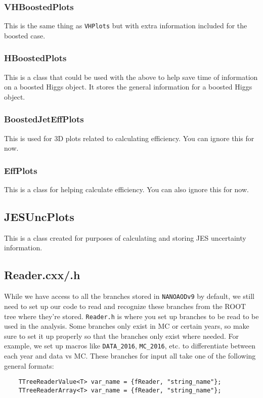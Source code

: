\subsubsection{VHBoostedPlots}
This is the same thing as \verb|VHPlots| but with extra information included for the boosted case.

\subsubsection{HBoostedPlots}
This is a class that could be used with the above to help save time of information on a boosted Higgs object. It stores the general information for a boosted Higgs object.

\subsubsection{BoostedJetEffPlots}
This is used for 3D plots related to calculating efficiency. You can ignore this for now.

\subsubsection{EffPlots}
This is a class for helping calculate efficiency. You can also ignore this for now.

\subsection{JESUncPlots}
This is a class created for purposes of calculating and storing JES uncertainty information. 

\subsection{Reader.cxx/.h}
While we have access to all the branches stored in \verb|NANOAODv9| by default, we still need to set up our code to read and recognize these branches from the ROOT tree where they're stored. \verb|Reader.h| is where you set up branches to be read to be used in the analysis. Some branches only exist in MC or certain years, so make sure to set it up properly so that the branches only exist where needed. For example, we set up macros like \verb|DATA_2016|, \verb|MC_2016|, etc. to differentiate between each year and data vs MC. These branches for input all take one of the following general formats:

\begin{verbatim}
    TTreeReaderValue<T> var_name = {fReader, "string_name"};
    TTreeReaderArray<T> var_name = {fReader, "string_name"};
\end{verbatim}


